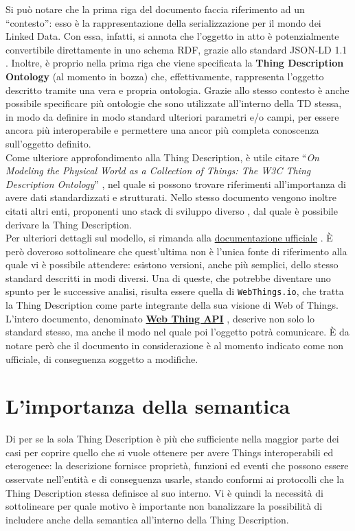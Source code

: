 \documentclass[12pt,a4paper,openright,oneside]{report}
\newcommand{\quotes}[1]{``#1''}
\begin{document}
Si può notare che la prima riga del documento faccia riferimento ad un \quotes{contesto}: esso è la rappresentazione della serializzazione per il mondo dei Linked Data. Con essa, infatti, si annota che l'oggetto in atto è potenzialmente convertibile direttamente in uno schema RDF, grazie allo standard JSON-LD 1.1 \cite{json-ld}. Inoltre, è proprio nella prima riga che viene specificata la \textbf{Thing Description Ontology} \cite{td} (al momento in bozza) che, effettivamente, rappresenta l'oggetto descritto tramite una vera e propria ontologia. Grazie allo stesso contesto è anche possibile specificare più ontologie che sono utilizzate all'interno della TD stessa, in modo da definire in modo standard ulteriori parametri e/o campi, per essere ancora più interoperabile e permettere una ancor più completa conoscenza sull'oggetto definito.\\

Come ulteriore approfondimento alla Thing Description, è utile citare \quotes{\textit{On Modeling the Physical World as a Collection of Things: The W3C Thing Description Ontology}} \cite{td-paper}, nel quale si possono trovare riferimenti all'importanza di avere dati standardizzati e strutturati. Nello stesso documento vengono inoltre citati altri enti, proponenti uno stack di sviluppo diverso \cite{open-connectivity}, dal quale è possibile derivare la Thing Description.\\

Per ulteriori dettagli sul modello, si rimanda alla \underline{documentazione ufficiale} \cite{td}. È però doveroso sottolineare che quest'ultima non è l'unica fonte di riferimento alla quale vi è possibile attendere: esistono versioni, anche più semplici, dello stesso standard descritti in modi diversi. Una di queste, che potrebbe diventare uno spunto per le successive analisi, risulta essere quella di \texttt{WebThings.io}, che tratta la Thing Description come parte integrante della sua visione di Web of Things. L'intero documento, denominato \href{https://webthings.io/api/}{\textbf{Web Thing API}} \cite{webthings}, descrive non solo lo standard stesso, ma anche il modo nel quale poi l'oggetto potrà comunicare. È da notare però che il documento in considerazione è al momento indicato come non ufficiale, di conseguenza soggetto a modifiche.\\


\section{L'importanza della semantica}
\label{sec:semantic}
Di per se la sola Thing Description è più che sufficiente nella maggior parte dei casi per coprire quello che si vuole ottenere per avere Things interoperabili ed eterogenee: la descrizione fornisce proprietà, funzioni ed eventi che possono essere osservate nell'entità e di conseguenza usarle, stando conformi ai protocolli che la Thing Description stessa definisce al suo interno. Vi è quindi la necessità di sottolineare per quale motivo è importante non banalizzare la possibilità di includere anche della semantica all'interno della Thing Description.\\
\end{document}
